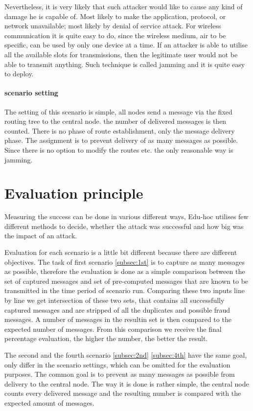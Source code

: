 \documentclass[
  print, %
  Table,   %
  nolof,     %
  nolot,     %
           oneside
]{fithesis3}
\begin{document}
    Nevertheless, it is very likely that such attacker would like to cause any kind of damage he is capable of. Most likely to make the application, protocol, or network unavailable; most likely by denial of service attack. For wireless communication it is quite easy to do, since the wireless medium, air to be specific, can be used by only one device at a time. If an attacker is able to utilise all the available slots for transmissions, then the legitimate user would not be able to transmit anything. Such technique is called jamming and it is quite easy to deploy.

    \paragraph{scenario setting}
    The setting of this scenario is simple, all nodes send a message via the fixed routing tree to the central node. the number of delivered messages is then counted. There is no phase of route establishment, only the message delivery phase. The assignment is to prevent delivery of as many messages as possible. Since there is no option to modify the routes etc. the only reasonable way is jamming.


  \section{Evaluation principle}\label{sec:eval}
  Measuring the success can be done in various different ways, Edu-hoc utilises few different methods to decide, whether the attack was successful and how big was the impact of an attack.

  Evaluation for each scenario is a little bit different because there are different objectives. The task of first scenario \ref{subsec:1st} is to capture as many messages as possible, therefore the evaluation is done as a simple comparison between the set of captured messages and set of pre-computed messages that are known to be transmitted in the time period of scenario run. Comparing these two inputs line by line we get intersection of these two sets, that contains all successfully captured messages and are stripped of all the duplicates and possible fraud messages. A number of messages in the resultin set is then compared to the expected number of messages. From this comparison we receive the final percentage evaluation, the higher the number, the better the result.

  The second and the fourth scenario \ref{subsec:2nd} \ref{subsec:4th} have the same goal, only differ in the scenario settings, which can be omitted for the evaluation purposes. The common goal is to prevent as many messages as possible from delivery to the central node. The way it is done is rather simple, the central node counts every delivered message and the resulting number is compared with the expected amount of messages.
\end{document}
